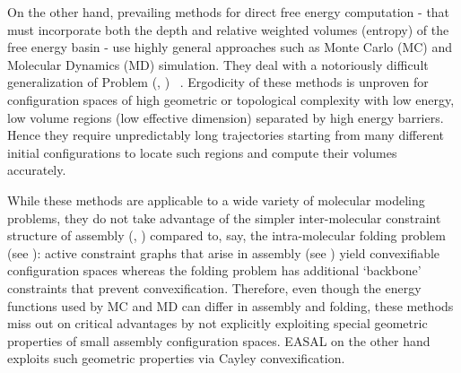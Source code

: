 On the other hand, prevailing methods for direct free energy computation - that
must incorporate both the depth and relative weighted volumes (entropy) of the
free energy basin - use highly general approaches such as Monte Carlo (MC) and
Molecular Dynamics (MD) simulation. They deal with a notoriously difficult
generalization of Problem (\cone, \ctwo) 
~\cite{kaku,Andricioaei_Karplus_2001,Hnizdo_Darian_Fedorowicz_Demchuk_Li_Singh_2007,Hnizdo_Tan_Killian_Gilson_2008,Hensen_Lange_Grubmuller_2010,Killian_Yundenfreund_Kravitz_Gilson_2007,Head_Given_Gilson_1997,GregoryS201199,doi:10.1021/jp2068123}.
Ergodicity of these methods is unproven for configuration spaces of high
geometric or topological complexity with low energy, low volume regions (low
effective dimension) separated by high energy barriers. Hence they require
unpredictably long trajectories starting from many different initial
configurations to locate such regions and compute their volumes accurately.


While these methods are applicable to a wide variety of molecular modeling
problems, they do not 
take advantage of the simpler inter-molecular
constraint structure of assembly (\cone, \ctwo) compared to,
say, the intra-molecular folding problem (see \cite{assembly:folding}):
active constraint graphs that arise in assembly (see ) 
yield convexifiable configuration spaces whereas
the folding problem has additional `backbone' constraints that prevent
convexification. 
Therefore, even though the energy functions used by
MC and MD can differ in assembly and folding, 
these methods miss out on critical advantages by not explicitly
exploiting special geometric properties of small assembly configuration spaces. 
EASAL on the other hand exploits such geometric properties 
via Cayley convexification. 

